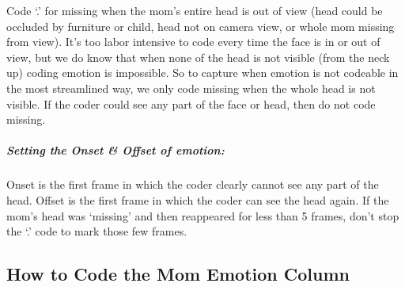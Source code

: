 \documentclass[
]{book}
\begin{document}
Code `.' for missing when the mom's entire head is out of view (head could be occluded by furniture or child, head not on camera view, or whole mom missing from view). It's too labor intensive to code every time the face is in or out of view, but we do know that when none of the head is not visible (from the neck up) coding emotion is impossible. So to capture when emotion is not codeable in the most streamlined way, we only code missing when the whole head is not visible. If the coder could see any part of the face or head, then do not code missing.

\hypertarget{setting-the-onset-offset-of-emotion-3}{%
\subparagraph{Setting the Onset \& Offset of emotion:}\label{setting-the-onset-offset-of-emotion-3}}

Onset is the first frame in which the coder clearly cannot see any part of the head.
Offset is the first frame in which the coder can see the head again.
If the mom's head was `missing' and then reappeared for less than 5 frames, don't stop the `.' code to mark those few frames.

\hypertarget{how-to-code-the-mom-emotion-column}{%
\subsection{How to Code the Mom Emotion Column}\label{how-to-code-the-mom-emotion-column}}
\end{document}
